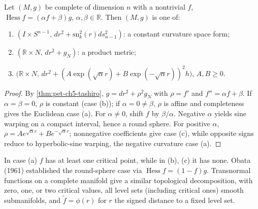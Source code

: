 \begin{theorem}[global classification for $\operatorname{Hess}f=(\alpha f+\beta)g$]
  \label{thm:pet-ch5-hessian-classification}

  Let $(M,g)$ be complete of dimension $n$ with a nontrivial $f$,
  $\operatorname{Hess}f=(\alpha f+\beta)g$, $\alpha,\beta\in\mathbb R$. Then
  $(M,g)$ is one of:
  \begin{enumerate}
  \item[(a)] $(I\times S^{n-1},\,dr^2+\mathrm{sn}_k^2(r)ds_{n-1}^2)$: a constant
  curvature space form;
  \item[(b)] $(\mathbb R\times N,\,dr^2+g_N)$: a product metric;
  \item[(c)] $\big(\mathbb R\times N,\,dr^2+(A\exp(\sqrt\alpha r)+B\exp(-\sqrt\alpha r))^2h\big)$,
  $A,B\ge0$.
  \end{enumerate}
\end{theorem}
\begin{proof}
  \sketch
  By \cref{thm:pet-ch5-tashiro}, $g=dr^2+\rho^2g_N$ with
  $\rho=f'$ and $f''=\alpha f+\beta$.  If $\alpha=\beta=0$, $\rho$ is constant
  (case (b)); if $\alpha=0\ne\beta$, $\rho$ is affine and completeness gives the
  Euclidean case (a).  For $\alpha\ne0$, shift $f$ by $\beta/\alpha$.  Negative
  $\alpha$ yields sine warping on a compact interval, hence a round sphere.  For
  positive $\alpha$,
  $\rho=Ae^{\sqrt\alpha r}+Be^{-\sqrt\alpha r}$; nonnegative coefficients give
  case (c), while opposite signs reduce to hyperbolic-sine warping, the negative
  curvature case (a).
\end{proof}

\begin{remark}
  \label{rem:pet-ch5-obata-transnormal}

  In case (a) $f$ has at least one critical point, while in (b), (c) it has none.
  Obata (1961) established the round-sphere case via $\operatorname{Hess}f=(1-f)g$.
  Transnormal functions on a complete manifold give a similar topological
  decomposition, with zero, one, or two critical values, all level sets (including
  critical ones) smooth submanifolds, and $\tilde f=\phi(r)$ for $r$ the signed
  distance to a fixed level set.
\end{remark}

